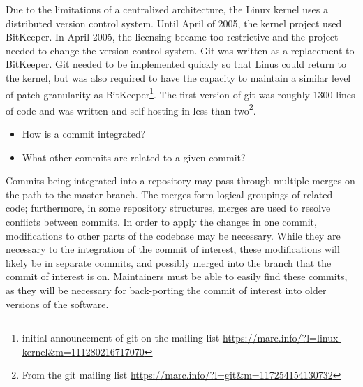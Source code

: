 Due to the limitations of a centralized architecture, the Linux kernel
uses a distributed version control system. Until April of 2005, the
kernel project used BitKeeper. In April 2005, the licensing became too
restrictive and the project needed to change the version control system.
Git was written as a replacement to BitKeeper. Git needed to be
implemented quickly so that Linus could return to the kernel, but was
also required to have the capacity to maintain a similar level of patch
granularity as BitKeeper\footnote{initial announcement of git on the
  mailing list
  \url{https://marc.info/?l=linux-kernel&m=111280216717070}}. The first
version of git was roughly 1300 lines of code and was written and
self-hosting in less than two\footnote{From the git mailing list
  \url{https://marc.info/?l=git&m=117254154130732}}.


\begin{textbox}
\begin{itemize}
  \item How is a commit integrated?
  \item What other commits are related to a given commit?
\end{itemize}
\end{textbox}

Commits being integrated into a repository may pass through multiple
merges on the path to the master branch. The merges form logical
groupings of related code; furthermore, in some repository structures,
merges are used to resolve conflicts between commits. In order to apply
the changes in one commit, modifications to other parts of the codebase
may be necessary. While they are necessary to the integration of the
commit of interest, these modifications will likely be in separate
commits, and possibly merged into the branch that the commit of interest
is on. Maintainers must be able to easily find these commits, as they
will be necessary for back-porting the commit of interest into older
versions of the software.

